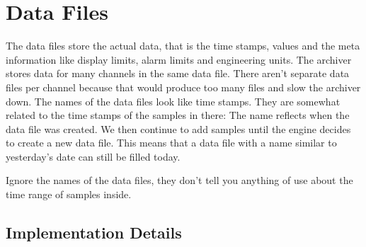 \section{Data Files}
The data files store the actual data, that is the time stamps, values
and the meta information like display limits, alarm limits and
engineering units. 
The archiver stores data for many channels in the same data
file. There aren't separate data files per channel because that would
produce too many files and slow the archiver down.  The names of the
data files look like time stamps. They are somewhat related to the
time stamps of the samples in there: The name reflects when the data
file was created. We then continue to add samples until the engine
decides to create a new data file. This means that a data file with a
name similar to yesterday's date can still be filled today.

 Ignore the names of the data files,
they don't tell you anything of use about the time range of samples
inside.

\subsection{Implementation Details}

